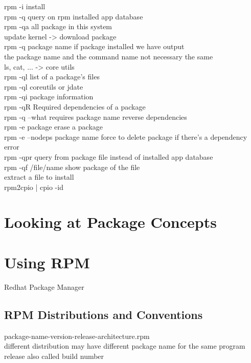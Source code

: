 \documentclass{book}
\begin{document}
	rpm -i install\\
	rpm -q query on rpm installed app database \\
	rpm -qa all package in this system\\
	update kernel -> download package\\
	rpm -q package name if package installed we have output\\
	the package name and the command name not necessary the same\\
	ls, cat, ... -> core utils\\
	rpm -ql list of a package's files\\
	rpm -ql coreutils or jdate\\
	rpm -qi package information \\
	rpm -qR Required dependencies of a package\\
	rpm -q --what requires package name reverse dependencies\\
	rpm -e package erase a package\\
	rpm -e --nodeps package name force to delete package if there's a dependency error\\
	rpm -qpr query from package file instead of installed app database\\
	rpm -qf /file/name show package of the file\\
	extract a file to install \\
	rpm2cpio | cpio -id\\
	
	
	
	\section{Looking at Package Concepts}
	\section{Using RPM}
	Redhat Package Manager\\
	\subsection{RPM Distributions and Conventions}
	package-name-version-release-architecture.rpm\\
	different distribution may have different package name for the same program\\
	release also called build number\\	
\end{document}
